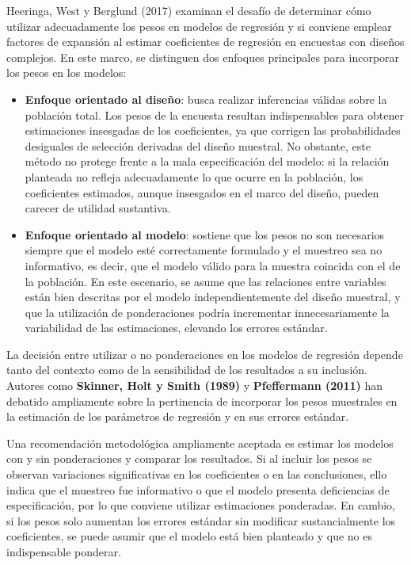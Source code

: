 \documentclass[
  spanish,
  12pt,
]{book}
\begin{document}
Heeringa, West y Berglund (2017) examinan el desafío de determinar cómo utilizar adecuadamente los pesos en modelos de regresión y si conviene emplear factores de expansión al estimar coeficientes de regresión en encuestas con diseños complejos. En este marco, se distinguen dos enfoques principales para incorporar los pesos en los modelos:

\begin{itemize}
\item
  \textbf{Enfoque orientado al diseño}: busca realizar inferencias válidas sobre la población total. Los pesos de la encuesta resultan indispensables para obtener estimaciones insesgadas de los coeficientes, ya que corrigen las probabilidades desiguales de selección derivadas del diseño muestral. No obstante, este método no protege frente a la mala especificación del modelo: si la relación planteada no refleja adecuadamente lo que ocurre en la población, los coeficientes estimados, aunque insesgados en el marco del diseño, pueden carecer de utilidad sustantiva.
\item
  \textbf{Enfoque orientado al modelo}: sostiene que los pesos no son necesarios siempre que el modelo esté correctamente formulado y el muestreo sea no informativo, es decir, que el modelo válido para la muestra coincida con el de la población. En este escenario, se asume que las relaciones entre variables están bien descritas por el modelo independientemente del diseño muestral, y que la utilización de ponderaciones podría incrementar innecesariamente la variabilidad de las estimaciones, elevando los errores estándar.
\end{itemize}

La decisión entre utilizar o no ponderaciones en los modelos de regresión depende tanto del contexto como de la sensibilidad de los resultados a su inclusión. Autores como \textbf{Skinner, Holt y Smith (1989)} y \textbf{Pfeffermann (2011)} han debatido ampliamente sobre la pertinencia de incorporar los pesos muestrales en la estimación de los parámetros de regresión y en sus errores estándar.

Una recomendación metodológica ampliamente aceptada es estimar los modelos con y sin ponderaciones y comparar los resultados. Si al incluir los pesos se observan variaciones significativas en los coeficientes o en las conclusiones, ello indica que el muestreo fue informativo o que el modelo presenta deficiencias de especificación, por lo que conviene utilizar estimaciones ponderadas. En cambio, si los pesos solo aumentan los errores estándar sin modificar sustancialmente los coeficientes, se puede asumir que el modelo está bien planteado y que no es indispensable ponderar.
\end{document}
